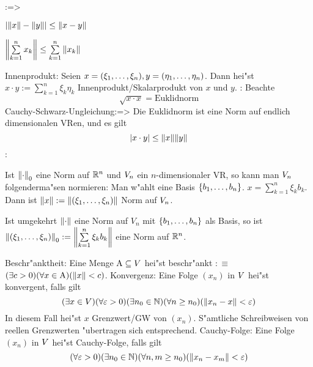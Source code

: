 \lessertheorem:=>{
  \begin{stmts}
    \item $| {\left\| x\right\|} - {\left\| y\right\|} | \leq {\left\| x-y\right\|}$ 
    \item $\norm{\sum_{k=1}^n x_k} \leq \sum_{k=1}^n \norm{x_k}$
    \end{stmts}
  }
 Innenprodukt:{
  Seien $x=(\xi_1,\ldots,\xi_n),y=(\eta_1,\ldots,\eta_n)$. 
  Dann hei"st $x\cdot y:=\sum_{k=1}^n \xi_k\eta_k$ Innenprodukt/Skalarprodukt 
  von $x$ und $y$.
  }
\remark:{
  Beachte
  \[\sqrt{x\cdot x} = \text{Euklidnorm}
    \]
  }
\theorem Cauchy-Schwarz-Ungleichung:=>{
  Die Euklidnorm ist eine Norm auf endlich dimensionalen VRen, und es gilt
  \[|x\cdot y|\leq{\left\| x\right\|} {\left\| y\right\|}
    \]
  }
\remark:{
  Ist ${\left\| \cdot\right\|}_0$ eine Norm auf $\mathbb R^n$ und $V_n$ ein $n$-dimensionaler
  VR, so kann man $V_n$ folgenderma"sen normieren: Man w"ahlt eine Basis
  $\{b_1,\ldots,b_n\}$. $x=\sum_{k=1}^n \xi_k b_k$. Dann ist 
  ${\left\| x\right\|}:={\left\| (\xi_1,\ldots,\xi_n)\right\|}$ Norm auf $V_n$.
  
  Ist umgekehrt ${\left\| \cdot\right\|}$ eine Norm auf $V_n$ mit $\{b_1,\ldots,b_n\}$ als Basis,
  so ist $\norm{(\ntuple \xi)}_0:=\norm{\sum_{k=1}^n \xi_k b_k}$ eine Norm
  auf $\mathbb R^n$.
  }
 Beschr"anktheit:{
  Eine Menge ${\rm A}\subseteq V$ hei"st beschr"ankt $:\equiv$
  $(\exists c>0)(\forall x\in{\rm A})({\left\| x\right\|} < c)$.
  }
\lesserdefinition Konvergenz:{
  Eine Folge $(x_n)$ in $V$ hei"st konvergent, falls gilt
  \[(\exists x\in V)(\forall \varepsilon>0)(\exists n_0\in\mathbb N)(\forall n\geq n_0)({\left\| x_n-x\right\|}<\varepsilon)
    \]
  In diesem Fall hei"st $x$ Grenzwert/GW von $(x_n)$. S"amtliche Schreibweisen
  von reellen Grenzwerten "ubertragen sich entsprechend.  
  }
\lesserdefinition Cauchy-Folge:{
  Eine Folge $(x_n)$ in $V$ hei"st Cauchy-Folge, falls gilt 
  \[(\forall \varepsilon>0)(\exists n_0\in\mathbb N)(\forall n,m\geq n_0)({\left\| x_n-x_m\right\|}<\varepsilon)
    \]
  }
